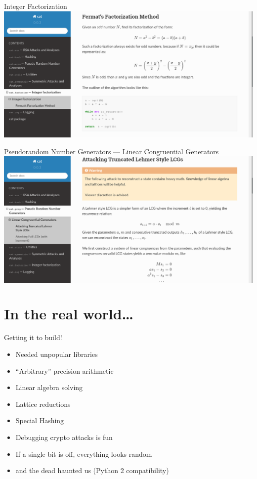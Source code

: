 \documentclass[10pt,aspectratio=169,table,usenames,dvipsnames,table]{beamer}
\begin{document}
\begin{frame}{Integer Factorization}
  \includegraphics[width=\textwidth, height=0.8\textheight, keepaspectratio]{fermat_doc.png}
\end{frame}

\begin{frame}{Pseudorandom Number Generators --- Linear Congruential Generators}
  \includegraphics[width=\textwidth, height=0.8\textheight, keepaspectratio]{lcg_doc.png}
\end{frame}

\section{In the real world\ldots}

\begin{frame}{Getting it to build!}
  \begin{itemize}
    \item Needed unpopular libraries
      \item ``Arbitrary'' precision arithmetic
      \item Linear algebra solving
      \item Lattice reductions
      \item Special Hashing
    \vspace{1em}
    \item Debugging crypto attacks is fun
    \item If a single bit is off, everything looks random
    \vspace{1em}
    \item and the dead haunted us (Python 2 compatibility)
  \end{itemize}
\end{frame}
\end{document}
